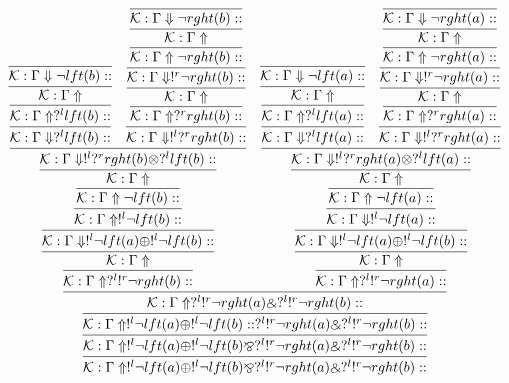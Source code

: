 \documentclass[a4paper, 11pt]{article}
\begin{document}
{\tiny
$$
\infer{\mathcal{K} : \Gamma \Uparrow  !^{l} \neg lft (a)  \oplus  !^{l} \neg lft (b)  \bindnasrepma  ?^{l}  !^{r} \neg rght (a)  \binampersand  ?^{l}  !^{r} \neg rght (b)  :: }
{\infer{\mathcal{K} : \Gamma \Uparrow  !^{l} \neg lft (a)  \oplus  !^{l} \neg lft (b)  \bindnasrepma  ?^{l}  !^{r} \neg rght (a)  \binampersand  ?^{l}  !^{r} \neg rght (b)  :: }
{\infer{\mathcal{K} : \Gamma \Uparrow  !^{l} \neg lft (a)  \oplus  !^{l} \neg lft (b)  ::  ?^{l}  !^{r} \neg rght (a)  \binampersand  ?^{l}  !^{r} \neg rght (b)  :: }
{\infer{\mathcal{K} : \Gamma \Uparrow  ?^{l}  !^{r} \neg rght (a)  \binampersand  ?^{l}  !^{r} \neg rght (b)  :: }
{\infer{\mathcal{K} : \Gamma \Uparrow  ?^{l}  !^{r} \neg rght (b)  :: }
{\infer{\mathcal{K} : \Gamma \Uparrow }
{\infer{\mathcal{K} : \Gamma \Downarrow  !^{l} \neg lft (a)  \oplus  !^{l} \neg lft (b)  :: }
{\infer{\mathcal{K} : \Gamma \Uparrow  !^{l} \neg lft (b)  :: }
{\infer{\mathcal{K} : \Gamma \Uparrow \neg lft (b)  :: }
{\infer{\mathcal{K} : \Gamma \Uparrow }
{\infer{\mathcal{K} : \Gamma \Downarrow  !^{l}  ?^{r} rght (b)  \otimes  ?^{l} lft (b)  :: }
{\infer{\mathcal{K} : \Gamma \Downarrow  ?^{l} lft (b)  :: }
{\infer{\mathcal{K} : \Gamma \Uparrow  ?^{l} lft (b)  :: }
{\infer{\mathcal{K} : \Gamma \Uparrow }
{\infer{\mathcal{K} : \Gamma \Downarrow \neg lft (b)  :: }
{}}}} & \infer{\mathcal{K} : \Gamma \Downarrow  !^{l}  ?^{r} rght (b)  :: }
{\infer{\mathcal{K} : \Gamma \Uparrow  ?^{r} rght (b)  :: }
{\infer{\mathcal{K} : \Gamma \Uparrow }
{\infer{\mathcal{K} : \Gamma \Downarrow  !^{r} \neg rght (b)  :: }
{\infer{\mathcal{K} : \Gamma \Uparrow \neg rght (b)  :: }
{\infer{\mathcal{K} : \Gamma \Uparrow }
{\infer{\mathcal{K} : \Gamma \Downarrow \neg rght (b)  :: }
{}}}}}}}}}}}}}} & \infer{\mathcal{K} : \Gamma \Uparrow  ?^{l}  !^{r} \neg rght (a)  :: }
{\infer{\mathcal{K} : \Gamma \Uparrow }
{\infer{\mathcal{K} : \Gamma \Downarrow  !^{l} \neg lft (a)  \oplus  !^{l} \neg lft (b)  :: }
{\infer{\mathcal{K} : \Gamma \Downarrow  !^{l} \neg lft (a)  :: }
{\infer{\mathcal{K} : \Gamma \Uparrow \neg lft (a)  :: }
{\infer{\mathcal{K} : \Gamma \Uparrow }
{\infer{\mathcal{K} : \Gamma \Downarrow  !^{l}  ?^{r} rght (a)  \otimes  ?^{l} lft (a)  :: }
{\infer{\mathcal{K} : \Gamma \Downarrow  ?^{l} lft (a)  :: }
{\infer{\mathcal{K} : \Gamma \Uparrow  ?^{l} lft (a)  :: }
{\infer{\mathcal{K} : \Gamma \Uparrow }
{\infer{\mathcal{K} : \Gamma \Downarrow \neg lft (a)  :: }
{}}}} & \infer{\mathcal{K} : \Gamma \Downarrow  !^{l}  ?^{r} rght (a)  :: }
{\infer{\mathcal{K} : \Gamma \Uparrow  ?^{r} rght (a)  :: }
{\infer{\mathcal{K} : \Gamma \Uparrow }
{\infer{\mathcal{K} : \Gamma \Downarrow  !^{r} \neg rght (a)  :: }
{\infer{\mathcal{K} : \Gamma \Uparrow \neg rght (a)  :: }
{\infer{\mathcal{K} : \Gamma \Uparrow }
{\infer{\mathcal{K} : \Gamma \Downarrow \neg rght (a)  :: }
{}}}}}}}}}}}}}}}}}}$$
}
\end{document}
